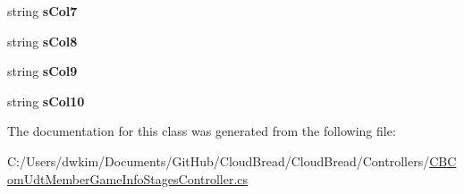 \begin{DoxyCompactItemize}
\item 
string {\bfseries s\+Col7}\hypertarget{a00106_a4ed66833fcba791460baccd6ad43aacb}{}\label{a00106_a4ed66833fcba791460baccd6ad43aacb}

\item 
string {\bfseries s\+Col8}\hypertarget{a00106_a82668b88a883d838eeeb9ee8eaa0866b}{}\label{a00106_a82668b88a883d838eeeb9ee8eaa0866b}

\item 
string {\bfseries s\+Col9}\hypertarget{a00106_a68d1ee1ca7a63e21a3297e5f58f7492f}{}\label{a00106_a68d1ee1ca7a63e21a3297e5f58f7492f}

\item 
string {\bfseries s\+Col10}\hypertarget{a00106_af68a7f967c2381e784f7d49e3b725e54}{}\label{a00106_af68a7f967c2381e784f7d49e3b725e54}

\end{DoxyCompactItemize}


The documentation for this class was generated from the following file\+:\begin{DoxyCompactItemize}
\item 
C\+:/\+Users/dwkim/\+Documents/\+Git\+Hub/\+Cloud\+Bread/\+Cloud\+Bread/\+Controllers/\hyperlink{a00211}{C\+B\+Com\+Udt\+Member\+Game\+Info\+Stages\+Controller.\+cs}\end{DoxyCompactItemize}
